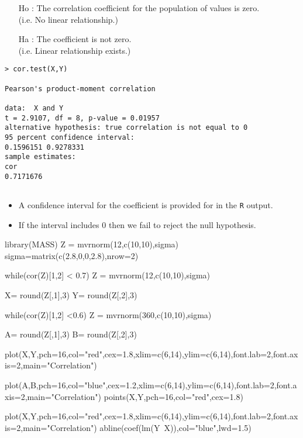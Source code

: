 \begin{itemize}
\item[Ho] : The correlation coefficient for the population of values is zero. \\(i.e. No linear relationship.)
\item[Ha] : The coefficient is not zero. \\ (i.e. Linear relationship exists.)
\end{itemize}
{

\begin{framed}
\begin{verbatim}
> cor.test(X,Y)

Pearson's product-moment correlation

data:  X and Y
t = 2.9107, df = 8, p-value = 0.01957
alternative hypothesis: true correlation is not equal to 0
95 percent confidence interval:
0.1596151 0.9278331
sample estimates:
cor 
0.7171676 


\end{verbatim}
\end{framed}
}

\begin{itemize}
\item A confidence interval for the coefficient is provided for in the \texttt{R} output. 
\item If the interval includes 0 then we fail to reject the null hypothesis.
\end{itemize}



library(MASS)
Z = mvrnorm(12,c(10,10),sigma) 
sigma=matrix(c(2.8,0,0,2.8),nrow=2)

while(cor(Z)[1,2] < 0.7)
 {
 Z = mvrnorm(12,c(10,10),sigma) 
 }

X= round(Z[,1],3)
Y= round(Z[,2],3)
 
while(cor(Z)[1,2] <0.6)
 {
 Z = mvrnorm(360,c(10,10),sigma) 
 }

A= round(Z[,1],3)
B= round(Z[,2],3)

plot(X,Y,pch=16,col="red",cex=1.8,xlim=c(6,14),ylim=c(6,14),font.lab=2,font.axis=2,main="Correlation")

plot(A,B,pch=16,col="blue",cex=1.2,xlim=c(6,14),ylim=c(6,14),font.lab=2,font.axis=2,main="Correlation")
points(X,Y,pch=16,col="red",cex=1.8)

plot(X,Y,pch=16,col="red",cex=1.8,xlim=c(6,14),ylim=c(6,14),font.lab=2,font.axis=2,main="Correlation")
abline(coef(lm(Y~X)),col="blue",lwd=1.5)



